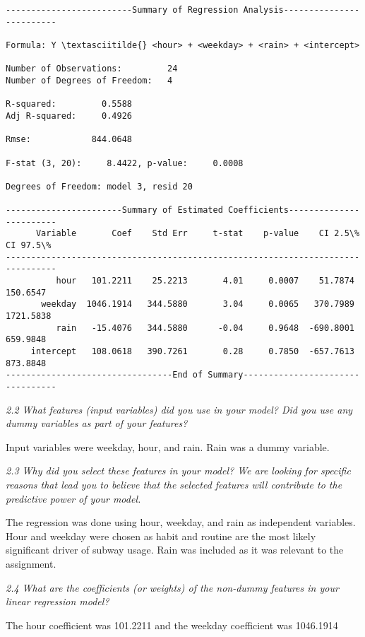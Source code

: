 \documentclass{article}
\begin{document}
    \begin{Verbatim}[commandchars=\\\{\}]
-------------------------Summary of Regression Analysis-------------------------

Formula: Y \textasciitilde{} <hour> + <weekday> + <rain> + <intercept>

Number of Observations:         24
Number of Degrees of Freedom:   4

R-squared:         0.5588
Adj R-squared:     0.4926

Rmse:            844.0648

F-stat (3, 20):     8.4422, p-value:     0.0008

Degrees of Freedom: model 3, resid 20

-----------------------Summary of Estimated Coefficients------------------------
      Variable       Coef    Std Err     t-stat    p-value    CI 2.5\%   CI 97.5\%
--------------------------------------------------------------------------------
          hour   101.2211    25.2213       4.01     0.0007    51.7874   150.6547
       weekday  1046.1914   344.5880       3.04     0.0065   370.7989  1721.5838
          rain   -15.4076   344.5880      -0.04     0.9648  -690.8001   659.9848
     intercept   108.0618   390.7261       0.28     0.7850  -657.7613   873.8848
---------------------------------End of Summary---------------------------------
    \end{Verbatim}

    \emph{2.2 What features (input variables) did you use in your model? Did
you use any dummy variables as part of your features?}

Input variables were weekday, hour, and rain. Rain was a dummy variable.

\emph{2.3 Why did you select these features in your model? We are
looking for specific reasons that lead you to believe that the selected
features will contribute to the predictive power of your model.}

The regression was done using hour, weekday, and rain as independent
variables. Hour and weekday were chosen as habit and routine are the
most likely significant driver of subway usage. Rain was included as it
was relevant to the assignment.

\emph{2.4 What are the coefficients (or weights) of the non-dummy
features in your linear regression model?}

The hour coefficient was 101.2211 and the weekday coefficient was
1046.1914
\end{document}
